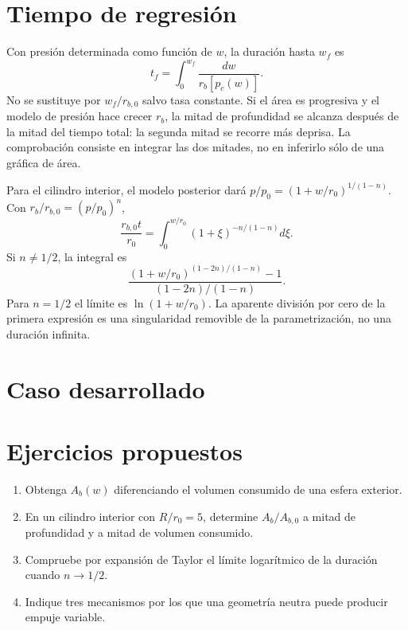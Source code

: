 \section{Tiempo de regresión}
Con presión determinada como función de $w$, la duración hasta $w_f$ es
\begin{equation}\label{eq:burntime}
 t_f=\int_0^{w_f}\frac{dw}{r_b[p_c(w)]}.
\end{equation}
No se sustituye por $w_f/r_{b,0}$ salvo tasa constante. Si el área es progresiva y el modelo de presión hace crecer $r_b$, la mitad de profundidad se alcanza después de la mitad del tiempo total: la segunda mitad se recorre más deprisa. La comprobación consiste en integrar las dos mitades, no en inferirlo sólo de una gráfica de área.

Para el cilindro interior, el modelo posterior dará $p/p_0=(1+w/r_0)^{1/(1-n)}$. Con $r_b/r_{b,0}=(p/p_0)^n$,
\[
 \frac{r_{b,0}t}{r_0}=\int_0^{w/r_0}(1+\xi)^{-n/(1-n)}d\xi.
\]
Si $n\ne1/2$, la integral es
\[
 \frac{(1+w/r_0)^{(1-2n)/(1-n)}-1}{(1-2n)/(1-n)}.
\]
Para $n=1/2$ el límite es $\ln(1+w/r_0)$. La aparente división por cero de la primera expresión es una singularidad removible de la parametrización, no una duración infinita.
\section{Caso desarrollado}

\section{Ejercicios propuestos}
\begin{enumerate}
\item Obtenga $A_b(w)$ diferenciando el volumen consumido de una esfera exterior.
\item En un cilindro interior con $R/r_0=5$, determine $A_b/A_{b,0}$ a mitad de profundidad y a mitad de volumen consumido.
\item Compruebe por expansión de Taylor el límite logarítmico de la duración cuando $n\to1/2$.
\item Indique tres mecanismos por los que una geometría neutra puede producir empuje variable.
\end{enumerate}


\studiumchaptercheck
